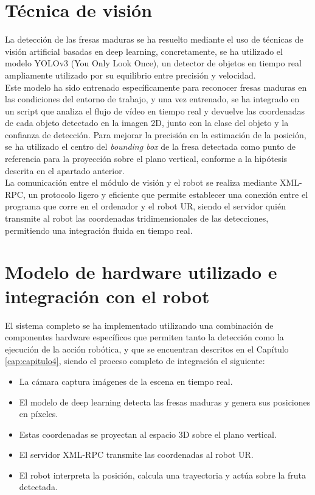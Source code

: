 \section{Técnica de visión}
\label{sec:Tecnica_Vision}

La detección de las fresas maduras se ha resuelto mediante el uso de técnicas de visión artificial basadas en deep learning, concretamente, se ha utilizado el modelo YOLOv3 (You Only Look Once), un detector de objetos en tiempo real ampliamente utilizado por su equilibrio entre precisión y velocidad.\\

Este modelo ha sido entrenado específicamente para reconocer fresas maduras en las condiciones del entorno de trabajo, y una vez entrenado, se ha integrado en un script que analiza el flujo de vídeo en tiempo real y devuelve las coordenadas de cada objeto detectado en la imagen 2D, junto con la clase del objeto y la confianza de detección. Para mejorar la precisión en la estimación de la posición, se ha utilizado el centro del \textit{bounding box} de la fresa detectada como punto de referencia para la proyección sobre el plano vertical, conforme a la hipótesis descrita en el apartado anterior.\\

La comunicación entre el módulo de visión y el robot se realiza mediante XML-RPC, un protocolo ligero y eficiente que permite establecer una conexión entre el programa que corre en el ordenador y el robot UR, siendo el servidor quién transmite al robot las coordenadas tridimensionales de las detecciones, permitiendo una integración fluida en tiempo real. 

\section{Modelo de hardware utilizado e integración con el robot}
\label{sec:modelo_HW}

El sistema completo se ha implementado utilizando una combinación de componentes hardware específicos que permiten tanto la detección como la ejecución de la acción robótica, y que se encuentran descritos en el Capítulo \ref{cap:capitulo4}, siendo el proceso completo de integración el siguiente:

\begin{itemize}
  \item La cámara captura imágenes de la escena en tiempo real.
  \item El modelo de deep learning detecta las fresas maduras y genera sus posiciones en píxeles.
  \item Estas coordenadas se proyectan al espacio 3D sobre el plano vertical.
  \item El servidor XML-RPC transmite las coordenadas al robot UR.
  \item El robot interpreta la posición, calcula una trayectoria y actúa sobre la fruta detectada.
\end{itemize}

